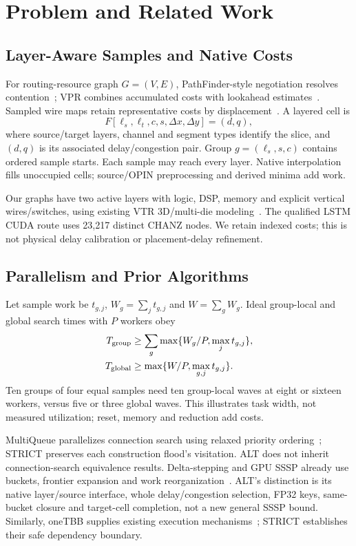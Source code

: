 \section{Problem and Related Work}
\subsection{Layer-Aware Samples and Native Costs}
For routing-resource graph $G=(V,E)$, PathFinder-style negotiation resolves contention~\cite{pathfinder}; VPR combines accumulated costs with lookahead estimates~\cite{vtr8,vtr9}. Sampled wire maps retain representative costs by displacement~\cite{diversity}. A layered cell is
\begin{equation}
F[\ell_s,\ell_t,c,s,\Delta x,\Delta y]=(d,q),
\end{equation}
where source/target layers, channel and segment types identify the slice, and $(d,q)$ is its associated delay/congestion pair. Group $g=(\ell_s,s,c)$ contains ordered sample starts. Each sample may reach every layer. Native interpolation fills unoccupied cells; source/OPIN preprocessing and derived minima add work.

Our graphs have two active layers with logic, DSP, memory and explicit vertical wires/switches, using existing VTR 3D/multi-die modeling~\cite{third_dimension,multidie}. The qualified LSTM CUDA route uses 23,217 distinct CHANZ nodes. We retain indexed costs; this is not physical delay calibration or placement-delay refinement.

\subsection{Parallelism and Prior Algorithms}
Let sample work be $t_{g,j}$, $W_g=\sum_jt_{g,j}$ and $W=\sum_gW_g$. Ideal group-local and global search times with $P$ workers obey
\begin{align}
T_{\rm group}&\geq\sum_g\max\{W_g/P,\max_jt_{g,j}\},\\
T_{\rm global}&\geq\max\{W/P,\max_{g,j}t_{g,j}\}.
\end{align}
Ten groups of four equal samples need ten group-local waves at eight or sixteen workers, versus five or three global waves. This illustrates task width, not measured utilization; reset, memory and reduction add costs.

MultiQueue parallelizes connection search using relaxed priority ordering~\cite{multiqueue}; STRICT preserves each construction flood's visitation. ALT does not inherit connection-search equivalence results. Delta-stepping and GPU SSSP already use buckets, frontier expansion and work reorganization~\cite{delta,gpu_sssp}. ALT's distinction is its native layer/source interface, whole delay/congestion selection, FP32 keys, same-bucket closure and target-cell completion, not a new general SSSP bound. Similarly, oneTBB supplies existing execution mechanisms~\cite{tbb}; STRICT establishes their safe dependency boundary.
